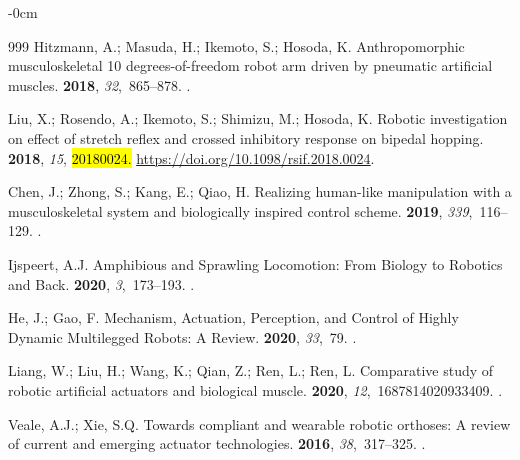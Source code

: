 \documentclass[actuators,article,accept,pdftex,moreauthors]{Definitions/mdpi}
\begin{document}
\begin{adjustwidth}{-\extralength}{0cm}
\begin{thebibliography}{999}
Hitzmann, A.; Masuda, H.; Ikemoto, S.; Hosoda, K.
\newblock Anthropomorphic musculoskeletal 10 degrees-of-freedom robot arm
  driven by pneumatic artificial muscles.
 {\bf 2018}, {\em 32},~865--878.
.

Liu, X.; Rosendo, A.; Ikemoto, S.; Shimizu, M.; Hosoda, K.
\newblock Robotic investigation on effect of stretch reflex and crossed
  inhibitory response on bipedal hopping.
 {\bf 2018}, {\em 15}, \hl{20180024.} %
  {\url{https://doi.org/10.1098/rsif.2018.0024}}.

Chen, J.; Zhong, S.; Kang, E.; Qiao, H.
\newblock Realizing human-like manipulation with a musculoskeletal system and
  biologically inspired control scheme.
 {\bf 2019}, {\em 339},~116--129.
.

Ijspeert, A.J.
\newblock Amphibious and {Sprawling} {Locomotion}: {From} {Biology} to
  {Robotics} and {Back}.
 {\bf
  2020}, {\em 3},~173--193.
.

He, J.; Gao, F.
\newblock Mechanism, {Actuation}, {Perception}, and {Control} of {Highly}
  {Dynamic} {Multilegged} {Robots}: {A} {Review}.
 {\bf 2020}, {\em
  33},~79.
.

Liang, W.; Liu, H.; Wang, K.; Qian, Z.; Ren, L.; Ren, L.
\newblock Comparative study of robotic artificial actuators and biological
  muscle.
 {\bf 2020}, {\em
  12},~1687814020933409.
.

Veale, A.J.; Xie, S.Q.
\newblock Towards compliant and wearable robotic orthoses: {A} review of
  current and emerging actuator technologies.
 {\bf 2016}, {\em 38},~317--325.
.


\end{thebibliography}
\end{adjustwidth}
\end{document}

